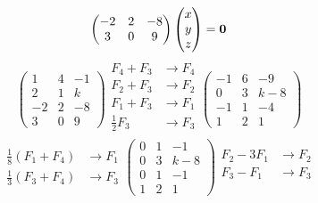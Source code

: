 \documentclass[../practica.root.tex]{subfiles}
\begin{document}
\begin{enumerate}
\[\begin{pmatrix}
                  -2 & 2 & -8 \\
                  3  & 0 & 9
              \end{pmatrix}
              \begin{pmatrix}
                  x \\ y \\ z
              \end{pmatrix}
              =
              \mathbf{0}
          \] \[
              \begin{pmatrix}
                  1  & 4 & -1 \\
                  2  & 1 & k  \\
                  -2 & 2 & -8 \\
                  3  & 0 & 9
              \end{pmatrix}
              \begin{array}{rl}
                  F_4 + F_3      & \to F_4 \\
                  F_2 + F_3      & \to F_2 \\
                  F_1 + F_3      & \to F_1 \\
                  \frac{1}{2}F_3 & \to F_3 \\
              \end{array}
              \begin{pmatrix}
                  -1 & 6 & -9  \\
                  0  & 3 & k-8 \\
                  -1 & 1 & -4  \\
                  1  & 2 & 1
              \end{pmatrix}
          \] \[
              \begin{array}{rl}
                  \frac{1}{8}(F_1 + F_4) & \to F_1 \\
                  \frac{1}{3}(F_3 + F_4) & \to F_3
              \end{array}
              \begin{pmatrix}
                  0 & 1 & -1  \\
                  0 & 3 & k-8 \\
                  0 & 1 & -1  \\
                  1 & 2 & 1
              \end{pmatrix}
              \begin{array}{rl}
                  F_2 - 3F_1 & \to F_2 \\
                  F_3 - F_1  & \to F_3 \\

\end{array}\]
\end{enumerate}
\end{document}

